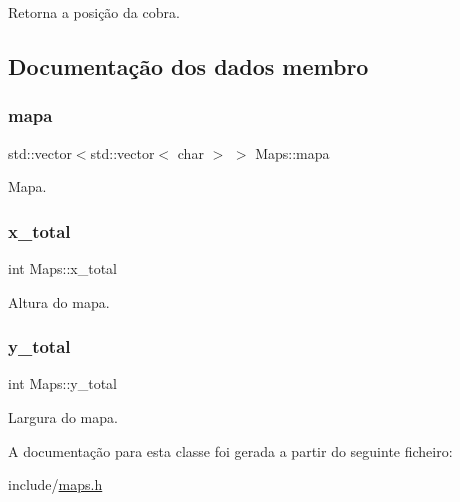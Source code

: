Retorna a posição da cobra. 



\subsection{Documentação dos dados membro}
\mbox{\label{classMaps_a7549d33bd2d17520c6b25bc43916bee6}} 
\subsubsection{\texorpdfstring{mapa}{mapa}}
{\footnotesize\ttfamily std\+::vector$<$std\+::vector$<$ char $>$ $>$ Maps\+::mapa\hspace{0.3cm}{\ttfamily [private]}}



Mapa. 

\mbox{\label{classMaps_aad719df183010234d9888873e9926970}} 
\subsubsection{\texorpdfstring{x\+\_\+total}{x\_total}}
{\footnotesize\ttfamily int Maps\+::x\+\_\+total\hspace{0.3cm}{\ttfamily [private]}}



Altura do mapa. 

\mbox{\label{classMaps_af6b314d34d63fc6f1567251e4b84447b}} 
\subsubsection{\texorpdfstring{y\+\_\+total}{y\_total}}
{\footnotesize\ttfamily int Maps\+::y\+\_\+total\hspace{0.3cm}{\ttfamily [private]}}



Largura do mapa. 



A documentação para esta classe foi gerada a partir do seguinte ficheiro\+:\begin{DoxyCompactItemize}
\item 
include/\hyperlink{maps_8h}{maps.\+h}\end{DoxyCompactItemize}
